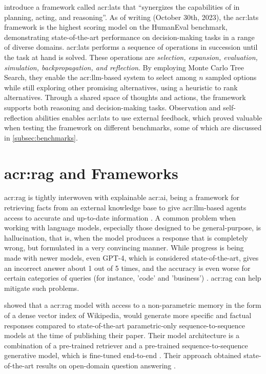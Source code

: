 \cite{zhouLanguageAgentTree2023} introduce a framework called \gls{acr:lats} that \enquote{synergizes the capabilities of  in planning, acting, and reasoning}. As of writing (October 30th, 2023), the \gls{acr:lats} framework is the highest scoring model on the HumanEval benchmark, demonstrating state-of-the-art performance on decision-making tasks in a range of diverse domains. \gls{acr:lats} performs a sequence of operations in succession until the task at hand is solved. These operations are \textit{selection, expansion, evaluation, simulation, backpropagation, and reflection}. By employing Monte Carlo Tree Search, they enable the \acrshort{acr:llm}-based system to select among $n$ sampled options while still exploring other promising alternatives, using a heuristic to rank alternatives. Through a shared space of thoughts and actions, the framework supports both reasoning and decision-making tasks. Observation and self-reflection abilities enables \acrshort{acr:lats} to use external feedback, which proved valuable when testing the framework on different benchmarks, some of which are discussed in \autoref{subsec:benchmarks}.



\section[Retrieval Augmented Generation and Frameworks]{\acrlong{acr:rag} and Frameworks}\label{sec:retrieval-automented-generation}

\acrfull{acr:rag} is tightly interwoven with explainable \acrshort{acr:ai}, being a framework for retrieving facts from an external knowledge base to give \acrshort{acr:llm}-based agents access to accurate and up-to-date information \citep{martineauWhatRetrievalaugmentedGeneration2023}. A common problem when working with language models, especially those designed to be general-purpose, is hallucination, that is, when the model produces a response that is completely wrong, but formulated in a very convincing manner. While progress is being made with newer models, even GPT-4, which is considered state-of-the-art, gives an incorrect answer about 1 out of 5 times, and the accuracy is even worse for certain categories of queries (for instance, 'code' and 'business') \citep[10]{openaiGPT4TechnicalReport2023}. \acrlong{acr:rag} can help mitigate such problems.

\cite{lewisRetrievalAugmentedGenerationKnowledgeIntensive2020} showed that a \gls{acr:rag} model with access to a non-parametric memory in the form of a dense vector index of Wikipedia, would generate more specific and factual responses compared to state-of-the-art parametric-only sequence-to-sequence models at the time of publishing their paper. Their model architecture is a combination of a pre-trained retriever and a pre-trained sequence-to-sequence generative model, which is fine-tuned end-to-end \citep[2]{lewisRetrievalAugmentedGenerationKnowledgeIntensive2020}. Their approach obtained state-of-the-art results on open-domain question answering \citep[5-6]{lewisRetrievalAugmentedGenerationKnowledgeIntensive2020}.

